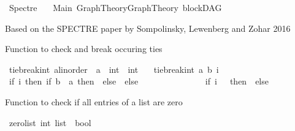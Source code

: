 %
\begin{isabellebody}%
%
%
\isadelimtheory
\isanewline
\isanewline
%
\endisadelimtheory
%
\isatagtheory
{}\isamarkupfalse%
\ Spectre\isanewline
\ \ \ Main\ Graph{\isacharunderscore}{\kern0pt}Theory{\isachardot}{\kern0pt}Graph{\isacharunderscore}{\kern0pt}Theory\ blockDAG\ \isanewline
{}%
\endisatagtheory
{\isafoldtheory}%
%
\isadelimtheory
%
\endisadelimtheory
%
\begin{isamarkuptext}%
Based on the SPECTRE paper by Sompolinsky, Lewenberg and Zohar 2016%
\end{isamarkuptext}\isamarkuptrue%
%
\isadelimdocument
%
\endisadelimdocument
%
\isatagdocument
%
\isamarkuptrue%
%
\isamarkuptrue%
%
\endisatagdocument
{\isafolddocument}%
%
\isadelimdocument
%
\endisadelimdocument
%
\begin{isamarkuptext}%
Function to check and break occuring ties%
\end{isamarkuptext}\isamarkuptrue%
\isamarkupfalse%
\ tie{\isacharunderscore}{\kern0pt}break{\isacharunderscore}{\kern0pt}int{\isacharcolon}{\kern0pt}{\isacharcolon}{\kern0pt}\ {\isachardoublequoteopen}{\isacharprime}{\kern0pt}a{\isacharcolon}{\kern0pt}{\isacharcolon}{\kern0pt}linorder\ {\isasymRightarrow}\ {\isacharprime}{\kern0pt}a\ {\isasymRightarrow}\ int\ {\isasymRightarrow}\ int{\isachardoublequoteclose}\isanewline
\ \ \ {\isachardoublequoteopen}tie{\isacharunderscore}{\kern0pt}break{\isacharunderscore}{\kern0pt}int\ a\ b\ i\ {\isacharequal}{\kern0pt}\isanewline
\ {\isacharparenleft}{\kern0pt}if\ i{\isacharequal}{\kern0pt}{}\ then\ {\isacharparenleft}{\kern0pt}if\ {\isacharparenleft}{\kern0pt}b\ {\isacharless}{\kern0pt}\ a{\isacharparenright}{\kern0pt}\ then\ {\isacharminus}{\kern0pt}{}\ else\ {}{\isacharparenright}{\kern0pt}\ else\ \isanewline
\ \ \ \ \ \ \ \ \ \ \ \ \ \ {\isacharparenleft}{\kern0pt}if\ i\ {\isachargreater}{\kern0pt}\ {}\ then\ {}\ else\ {\isacharminus}{\kern0pt}{}{\isacharparenright}{\kern0pt}{\isacharparenright}{\kern0pt}{\isachardoublequoteclose}%
\begin{isamarkuptext}%
Function to check if all entries of a list are zero%
\end{isamarkuptext}\isamarkuptrue%
\isamarkupfalse%
\ zero{\isacharunderscore}{\kern0pt}list{\isacharcolon}{\kern0pt}{\isacharcolon}{\kern0pt}\ {\isachardoublequoteopen}int\ list\ {\isasymRightarrow}\ bool{\isachardoublequoteclose}\isanewline

\end{isabellebody}
